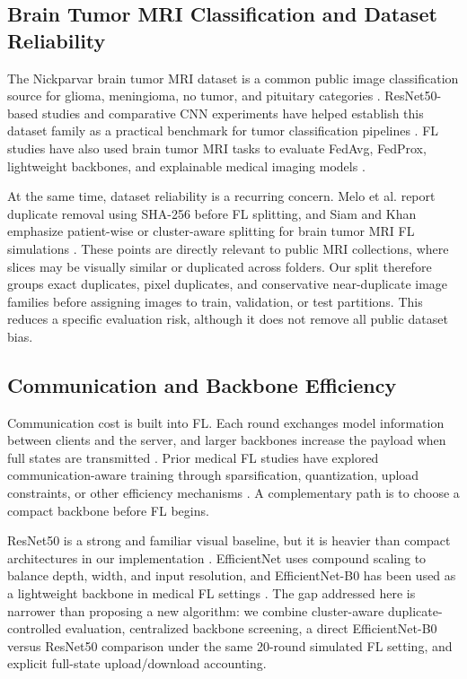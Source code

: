 \documentclass[10pt,twocolumn]{article}
\begin{document}
\subsection{Brain Tumor MRI Classification and Dataset Reliability}
The Nickparvar brain tumor MRI dataset is a common public image classification source for glioma, meningioma, no tumor, and pituitary categories \cite{nickparvar_brain_tumor_mri}. ResNet50-based studies and comparative CNN experiments have helped establish this dataset family as a practical benchmark for tumor classification pipelines \cite{he2016resnet,bentemessek2025brain,khatoon2026resnet50}. FL studies have also used brain tumor MRI tasks to evaluate FedAvg, FedProx, lightweight backbones, and explainable medical imaging models \cite{ghanta2025federated,sharma2025privacy,mastoi2025explainable}.

At the same time, dataset reliability is a recurring concern. Melo et al. report duplicate removal using SHA-256 before FL splitting, and Siam and Khan emphasize patient-wise or cluster-aware splitting for brain tumor MRI FL simulations \cite{melo2026exploiting,siam2026brain}. These points are directly relevant to public MRI collections, where slices may be visually similar or duplicated across folders. Our split therefore groups exact duplicates, pixel duplicates, and conservative near-duplicate image families before assigning images to train, validation, or test partitions. This reduces a specific evaluation risk, although it does not remove all public dataset bias.

\subsection{Communication and Backbone Efficiency}
Communication cost is built into FL. Each round exchanges model information between clients and the server, and larger backbones increase the payload when full states are transmitted \cite{mcmahan2017fedavg}. Prior medical FL studies have explored communication-aware training through sparsification, quantization, upload constraints, or other efficiency mechanisms \cite{radhika2026communication,aniket2025cfl,zhou2022communication,das2026federated}. A complementary path is to choose a compact backbone before FL begins.

ResNet50 is a strong and familiar visual baseline, but it is heavier than compact architectures in our implementation \cite{he2016resnet,bentemessek2025brain,khatoon2026resnet50}. EfficientNet uses compound scaling to balance depth, width, and input resolution, and EfficientNet-B0 has been used as a lightweight backbone in medical FL settings \cite{tan2019efficientnet,abubakr2026explainable}. The gap addressed here is narrower than proposing a new algorithm: we combine cluster-aware duplicate-controlled evaluation, centralized backbone screening, a direct EfficientNet-B0 versus ResNet50 comparison under the same 20-round simulated FL setting, and explicit full-state upload/download accounting.
\end{document}
